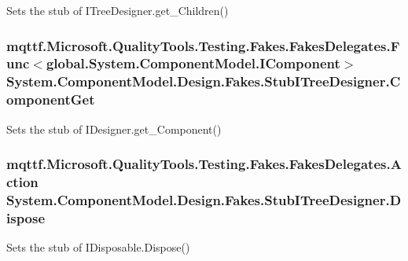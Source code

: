 Sets the stub of I\-Tree\-Designer.\-get\-\_\-\-Children()

\hypertarget{class_system_1_1_component_model_1_1_design_1_1_fakes_1_1_stub_i_tree_designer_a4c7af58ccf0ded20fc0ca2ef83bdc23b}{
\subsubsection[{Component\-Get}]{\setlength{\rightskip}{0pt plus 5cm}mqttf.\-Microsoft.\-Quality\-Tools.\-Testing.\-Fakes.\-Fakes\-Delegates.\-Func$<$global.\-System.\-Component\-Model.\-I\-Component$>$ System.\-Component\-Model.\-Design.\-Fakes.\-Stub\-I\-Tree\-Designer.\-Component\-Get}}\label{class_system_1_1_component_model_1_1_design_1_1_fakes_1_1_stub_i_tree_designer_a4c7af58ccf0ded20fc0ca2ef83bdc23b}


Sets the stub of I\-Designer.\-get\-\_\-\-Component()

\hypertarget{class_system_1_1_component_model_1_1_design_1_1_fakes_1_1_stub_i_tree_designer_aebe1d8a1183cac6825b7f9d2ef5bdd8c}{
\subsubsection[{Dispose}]{\setlength{\rightskip}{0pt plus 5cm}mqttf.\-Microsoft.\-Quality\-Tools.\-Testing.\-Fakes.\-Fakes\-Delegates.\-Action System.\-Component\-Model.\-Design.\-Fakes.\-Stub\-I\-Tree\-Designer.\-Dispose}}\label{class_system_1_1_component_model_1_1_design_1_1_fakes_1_1_stub_i_tree_designer_aebe1d8a1183cac6825b7f9d2ef5bdd8c}


Sets the stub of I\-Disposable.\-Dispose()

